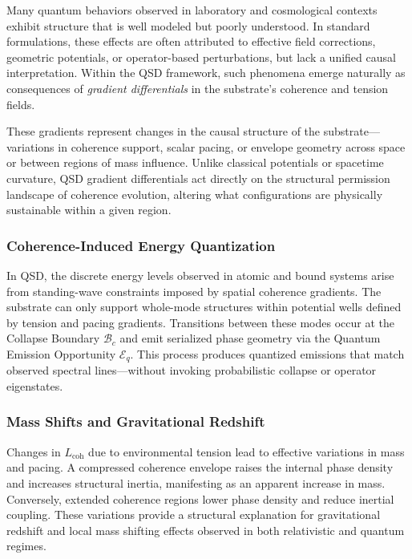 \documentclass[preprints,article,submit,pdftex,moreauthors]{Definitions/mdpi}
\begin{document}
Many quantum behaviors observed in laboratory and cosmological contexts exhibit structure that is well modeled but poorly understood. In standard formulations, these effects are often attributed to effective field corrections, geometric potentials, or operator-based perturbations, but lack a unified causal interpretation. Within the QSD framework, such phenomena emerge naturally as consequences of \textit{gradient differentials} in the substrate’s coherence and tension fields.

These gradients represent changes in the causal structure of the substrate—variations in coherence support, scalar pacing, or envelope geometry across space or between regions of mass influence. Unlike classical potentials or spacetime curvature, QSD gradient differentials act directly on the structural permission landscape of coherence evolution, altering what configurations are physically sustainable within a given region.

\subsubsection{Coherence-Induced Energy Quantization}

In QSD, the discrete energy levels observed in atomic and bound systems arise from standing-wave constraints imposed by spatial coherence gradients. The substrate can only support whole-mode structures within potential wells defined by tension and pacing gradients. Transitions between these modes occur at the Collapse Boundary \( \mathcal{B}_c \) and emit serialized phase geometry via the Quantum Emission Opportunity \( \mathcal{E}_q \). This process produces quantized emissions that match observed spectral lines—without invoking probabilistic collapse or operator eigenstates.

\subsubsection{Mass Shifts and Gravitational Redshift}

Changes in \( L_{\text{coh}} \) due to environmental tension lead to effective variations in mass and pacing. A compressed coherence envelope raises the internal phase density and increases structural inertia, manifesting as an apparent increase in mass. Conversely, extended coherence regions lower phase density and reduce inertial coupling. These variations provide a structural explanation for gravitational redshift and local mass shifting effects observed in both relativistic and quantum regimes.
\end{document}
